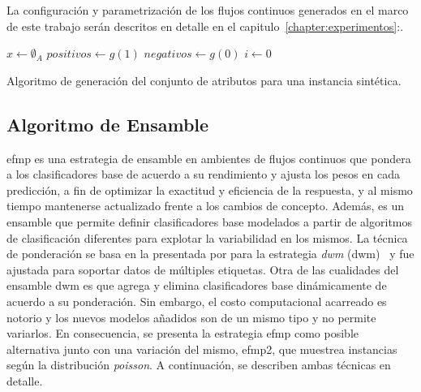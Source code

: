La configuración y parametrización de los flujos continuos generados en el marco
de este trabajo serán descritos en detalle en el
capitulo~\ref{chapter:experimentos}:.

\begin{center}
	\begin{algorithm}[H]
		\label{alg:generar_atributos}
		\SetAlgoLined
		\DontPrintSemicolon
		$x \gets \emptyset_{A}$\;
		$positivos \gets g(1)$ \;
		$negativos \gets g(0)$ \;
		$i \gets 0$ \;
		\caption{Algoritmo de generación del conjunto de atributos para una
			instancia sintética.}
	\end{algorithm}
\end{center}

\subsection{Algoritmo de Ensamble}
\label{tecnica_algoritmo_ensamble}

\acrfull{efmp} es una estrategia de ensamble en ambientes de flujos continuos
que pondera a los clasificadores base de acuerdo a su rendimiento y ajusta los
pesos en cada predicción, a fin de optimizar la exactitud y eficiencia de la
respuesta, y al mismo tiempo mantenerse actualizado frente a los cambios de
concepto. Además, es un ensamble que permite definir clasificadores base
modelados a partir de algoritmos de clasificación diferentes para explotar la
variabilidad en los mismos. La técnica de ponderación se basa en la presentada
por \citeauthor{kolter_dynamic_2007} para la estrategia \textit{\acrlong{dwm}}
(\acrshort{dwm})~\cite{kolter_dynamic_2007} y fue ajustada para soportar datos
de múltiples etiquetas. Otra de las cualidades del ensamble \acrshort{dwm} es
que agrega y elimina clasificadores base dinámicamente de acuerdo a su
ponderación. Sin embargo, el costo computacional acarreado es notorio y los
nuevos modelos añadidos son de un mismo tipo y no permite variarlos.  En
consecuencia, se presenta la estrategia \acrshort{efmp} como posible alternativa
junto con una variación del mismo, \acrshort{efmp2}, que muestrea instancias
según la distribución \textit{poisson}. A continuación, se describen ambas
técnicas en detalle.

